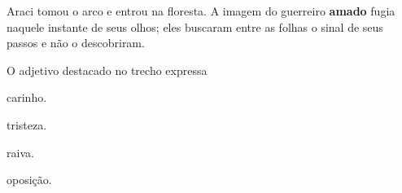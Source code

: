 \begin{myquote}
\textit{}

Araci tomou o arco e entrou na floresta. A imagem do guerreiro
\textbf{amado} fugia naquele instante de seus olhos; eles buscaram entre as
folhas o sinal de seus passos e não o descobriram.

\end{myquote}

O adjetivo destacado no trecho expressa

\begin{escolha}
  \item carinho.

  \item tristeza.

  \item raiva.

  \item oposição.
\end{escolha}

